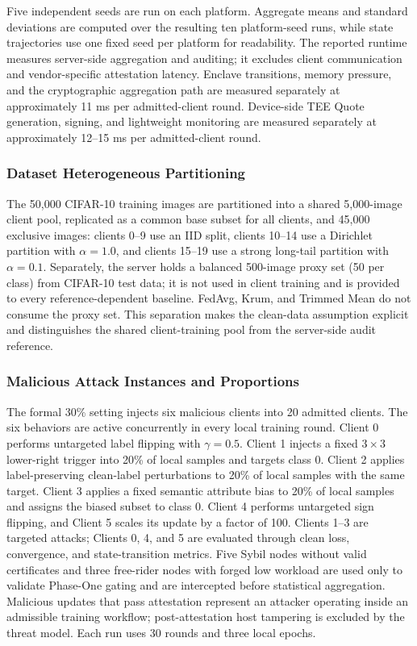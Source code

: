 \documentclass[11pt, a4paper]{article}
\begin{document}
Five independent seeds are run on each platform. Aggregate means and standard
deviations are computed over the resulting ten platform-seed runs, while
state trajectories use one fixed seed per platform for readability. The
reported runtime measures server-side aggregation and auditing; it excludes
client communication and vendor-specific attestation latency. Enclave
transitions, memory pressure, and the cryptographic aggregation path are
measured separately at approximately 11 ms per admitted-client round.
Device-side TEE Quote generation, signing, and lightweight monitoring are
measured separately at approximately 12--15 ms per admitted-client round.

\subsubsection{Dataset Heterogeneous Partitioning}
The 50,000 CIFAR-10 training images are partitioned into a shared 5,000-image
client pool, replicated as a common base subset for all clients, and 45,000
exclusive images: clients 0--9 use an IID split, clients 10--14 use a Dirichlet
partition with $\alpha=1.0$, and clients 15--19 use a strong long-tail partition
with $\alpha=0.1$. Separately, the server holds a balanced 500-image proxy
set (50 per class) from CIFAR-10 test data; it is not used in client training and
is provided to every reference-dependent baseline. FedAvg, Krum, and Trimmed
Mean do not consume the proxy set. This separation makes the clean-data
assumption explicit and distinguishes the shared client-training pool from the
server-side audit reference.

\subsubsection{Malicious Attack Instances and Proportions}
The formal 30\% setting injects six malicious clients into 20 admitted clients.
The six behaviors are active concurrently in every local training round. Client
0 performs untargeted label flipping with $\gamma=0.5$. Client 1 injects a
fixed $3\times3$ lower-right trigger into 20\% of local samples and targets
class 0. Client 2 applies label-preserving clean-label perturbations to 20\% of
local samples with the same target. Client 3 applies a fixed semantic attribute
bias to 20\% of local samples and assigns the biased subset to class 0. Client
4 performs untargeted sign flipping, and Client 5 scales its update by a factor
of 100. Clients 1--3 are targeted attacks; Clients 0, 4, and 5 are evaluated
through clean loss, convergence, and state-transition metrics. Five Sybil nodes
without valid certificates and three free-rider nodes with forged low workload
are used only to validate Phase-One gating and are intercepted before
statistical aggregation. Malicious updates that pass attestation represent an
attacker operating inside an admissible training workflow; post-attestation
host tampering is excluded by the threat model. Each run uses 30 rounds and
three local epochs.
\end{document}
